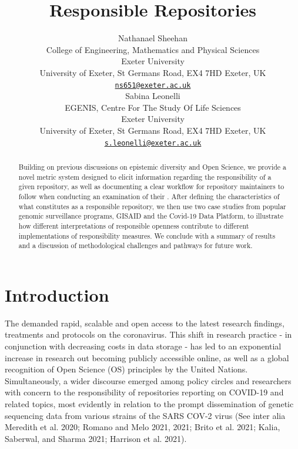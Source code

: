 \documentclass{article}
\title{Responsible Repositories}
\author{
    Nathanael Sheehan
   \\
    College of Engineering, Mathematics and Physical Sciences \\
    Exeter University \\
  University of Exeter, St Germans Road, EX4 7HD Exeter, UK \\
  \texttt{\href{mailto:ns651@exeter.ac.uk}{\nolinkurl{ns651@exeter.ac.uk}}} \\
   \And
    Sabina Leonelli
   \\
    EGENIS, Centre For The Study Of Life Sciences \\
    Exeter University \\
  University of Exeter, St Germans Road, EX4 7HD Exeter, UK \\
  \texttt{\href{mailto:s.leonelli@exeter.ac.uk}{\nolinkurl{s.leonelli@exeter.ac.uk}}} \\
  }
\begin{document}
\maketitle


\begin{abstract}
Building on previous discussions on epistemic diversity and Open
Science, we provide a novel metric system designed to elicit information
regarding the responsibility of a given repository, as well as
documenting a clear workflow for repository maintainers to follow when
conducting an examination of their . After defining the characteristics
of what constitutes as a responsible repository, we then use two case
studies from popular genomic surveillance programs, GISAID and the
Covid-19 Data Platform, to illustrate how different interpretations of
responsible openness contribute to different implementations of
responsibility measures. We conclude with a summary of results and a
discussion of methodological challenges and pathways for future work.
\end{abstract}


\newpage

\hypertarget{introduction}{%
\section{Introduction}\label{introduction}}

The demanded rapid, scalable and open access to the latest research
findings, treatments and protocols on the coronavirus. This shift in
research practice - in conjunction with decreasing costs in data storage
- has led to an exponential increase in research out becoming publicly
accessible online, as well as a global recognition of Open Science (OS)
principles by the United Nations. Simultaneously, a wider discourse
emerged among policy circles and researchers with concern to the
responsibility of repositories reporting on COVID-19 and related topics,
most evidently in relation to the prompt dissemination of genetic
sequencing data from various strains of the SARS COV-2 virus (See inter
alia Meredith et al. 2020; Romano and Melo 2021, 2021; Brito et al.
2021; Kalia, Saberwal, and Sharma 2021; Harrison et al. 2021).
\end{document}
